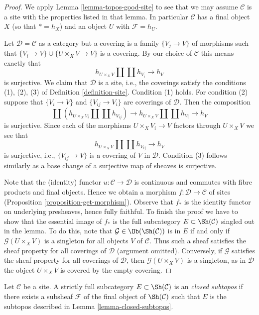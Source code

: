 \begin{proof}
We apply Lemma \ref{lemma-topos-good-site} to see that we may assume
$\mathcal{C}$ is a site with the properties listed in that lemma.
In particular $\mathcal{C}$ has a final object $X$ (so that
$* = h_X$) and an object $U$ with $\mathcal{F} = h_U$.

\medskip\noindent
Let $\mathcal{D} = \mathcal{C}$ as a category but a covering
is a family $\{V_j \to V\}$ of morphisms such that
$\{V_i \to V\} \cup \{U \times_X V \to V\}$ is a covering.
By our choice of $\mathcal{C}$ this means exactly that
$$
h_{U \times_X V} \coprod \coprod h_{V_i} \longrightarrow h_V
$$
is surjective. We claim that $\mathcal{D}$ is a site, i.e., the coverings
satisfy the conditions (1), (2), (3) of Definition \ref{definition-site}.
Condition (1) holds. For condition (2) suppose that
$\{V_i \to V\}$ and $\{V_{ij} \to V_i\}$ are coverings of $\mathcal{D}$.
Then the composition
$$
\coprod \left(
h_{U \times_X V_i} \coprod \coprod h_{V_{ij}}
\right) \longrightarrow
h_{U \times_X V} \coprod \coprod h_{V_i} \longrightarrow h_V
$$
is surjective. Since each of the morphisms $U \times_X V_i \to V$
factors through $U \times_X V$ we see that
$$
h_{U \times_X V} \coprod \coprod h_{V_{ij}} \longrightarrow h_V
$$
is surjective, i.e., $\{V_{ij} \to V\}$ is a covering of $V$ in
$\mathcal{D}$. Condition (3) follows similarly as a base change of
a surjective map of sheaves is surjective.

\medskip\noindent
Note that the (identity) functor $u : \mathcal{C} \to \mathcal{D}$ is
continuous and commutes with fibre products and final objects. Hence
we obtain a morphism $f : \mathcal{D} \to \mathcal{C}$ of sites
(Proposition \ref{proposition-get-morphism}).
Observe that $f_*$ is the identity functor on underlying
presheaves, hence fully faithful. To finish the proof we have to
show that the essential image of $f_*$ is the full subcategory
$E \subset \Sh(\mathcal{C})$ singled out in the lemma. To do this, note
that $\mathcal{G} \in \Ob(\Sh(\mathcal{C}))$ is in $E$ if and only if
$\mathcal{G}(U \times_X V)$ is a singleton for all objects
$V$ of $\mathcal{C}$. Thus such a sheaf satisfies the
sheaf property for all coverings of $\mathcal{D}$ (argument omitted).
Conversely, if $\mathcal{G}$ satisfies the sheaf property
for all coverings of $\mathcal{D}$, then $\mathcal{G}(U \times_X V)$
is a singleton, as in $\mathcal{D}$ the object $U \times_X V$ is
covered by the empty covering.
\end{proof}

\begin{definition}
\label{definition-closed-subtopos}
Let $\mathcal{C}$ be a site. A strictly full subcategory
$E \subset \Sh(\mathcal{C})$ is an {\it closed subtopos}
if there exists a subsheaf $\mathcal{F}$ of the final object
of $\Sh(\mathcal{C})$ such that $E$ is the subtopos
described in Lemma \ref{lemma-closed-subtopos}.
\end{definition}


